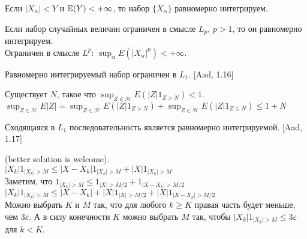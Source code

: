 \begin{problem}
Если $|X_{\alpha}|<Y$ и $\mathbb{E}(Y)<+\infty$, то набор $\{X_{\alpha}\}$
равномерно интегрируем.

\begin{sol}

\end{sol}
\end{problem}

\begin{problem}
Если набор случайных величин ограничен в смысле $L_{p}$,
$p>1$, то он равномерно интегрируем. \\
Ограничен в смысле $L^{p}$:
$\sup_{\alpha}E\left(|X_{\alpha}|^{p}\right)<+\infty$.

\begin{sol}

\end{sol}
\end{problem}

\begin{problem}
Равномерно интегрируемый набор ограничен в $L_{1}$. [Aad, 1.16]

\begin{sol}

Существует $N$, такое что $\sup_{Z\in \mathcal{H}}E
\left(|Z|1_{Z>N} \right)<1$. \\
$\sup_{Z\in \mathcal{H}}E |Z|=\sup_{Z\in \mathcal{H}}E
\left(|Z|1_{Z>N} \right)+\sup_{Z\in \mathcal{H}}E \left(|Z|1_{Z\le
N} \right)\le
1+N$
\end{sol}
\end{problem}

\begin{problem}
Сходящаяся в $L_{1}$ последовательность является равномерно
интегрируемой. [Aad, 1.17]

\begin{sol}

(better solution is welcome). \\
$|X_{k}|1_{|X_{k}|>M}\le |X-X_{k}|1_{|X_{k}|>M}+|X|1_{|X_{k}|>M}$
\\
Заметим, что $1_{|X_{k}|>M}\le 1_{|X|>M/2}+1_{|X-X_{k}|>M/2}$ \\
$|X_{k}|1_{|X_{k}|>M}\le
|X-X_{k}|+|X|1_{|X|>M/2}+|X|1_{|X-X_{k}|>M/2}$ \\
Можно выбрать $K$ и $M$ так, что для любого $k\ge K$ правая часть
будет меньше, чем $3\varepsilon$. А в силу конечности $K$ можно
выбрать $M$ так, чтобы $|X_{k}|1_{|X_{k}|>M}\le 3\varepsilon$ для
$k<K$.
\end{sol}
\end{problem}


